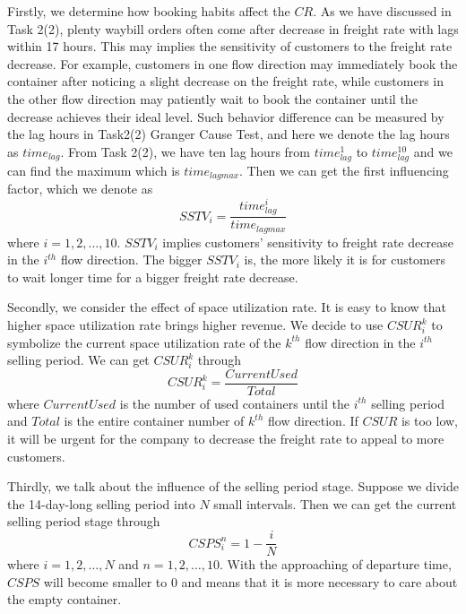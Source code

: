 \begin{enumerate}[\quad\bf1.]
\hspace{1em}
Firstly, we determine how booking habits affect the $CR$. As we have discussed in Task 2(2), plenty waybill orders often come after decrease in freight rate with lags within 17 hours. This may implies the sensitivity of customers to the freight rate decrease. For example, customers in one flow direction may immediately book the container after noticing a slight decrease on the freight rate, while customers in the other flow direction may patiently wait to book the container until the decrease achieves their ideal level. Such behavior difference can be measured by the lag hours in Task2(2) Granger Cause Test, and here we denote the lag hours as $time_{lag}$. From Task 2(2), we have ten lag hours from $time_{lag}^1$ to $time_{lag}^{10}$ and we can find the maximum which is $time_{lagmax}$. Then we can get the first influencing factor, which we denote as 
\begin{equation*}
    SSTV_i = \frac{time_{lag}^i}{time_{lagmax}}
\end{equation*}
where $i = 1,2,\dots,10$. $SSTV_i$ implies customers' sensitivity to freight rate decrease in the $i^{th}$ flow direction. The bigger $SSTV_i$ is, the more likely it is for customers to wait longer time for a bigger freight rate decrease.

\hspace{1em}
Secondly, we consider the effect of space utilization rate. It is easy to know that higher space utilization rate brings higher revenue. We decide to use $CSUR_i^k$ to symbolize the current space utilization rate of the $k^{th}$ flow direction in the $i^{th}$ selling period. We can get $CSUR_i^k$ through 
\begin{equation*}
    CSUR_i^k = \frac{CurrentUsed}{Total}
\end{equation*}
where $CurrentUsed$ is the number of used containers until the $i^{th}$ selling period and $Total$ is the entire container number of $k^{th}$ flow direction. If $CSUR$ is too low, it will be urgent for the company to decrease the freight rate to appeal to more customers.

\hspace{1em}
Thirdly, we talk about the influence of the selling period stage. Suppose we divide the 14-day-long selling period into $N$ small intervals. Then we can get the current selling period stage through 
\begin{equation*}
    CSPS_i^n = 1-\frac{i}{N}
\end{equation*}
where $i = 1,2,\dots,N$ and $n = 1,2,\dots,10$. With the approaching of departure time, $CSPS$ will become smaller to 0 and means that it is more necessary to care about the empty container.


\end{enumerate}
